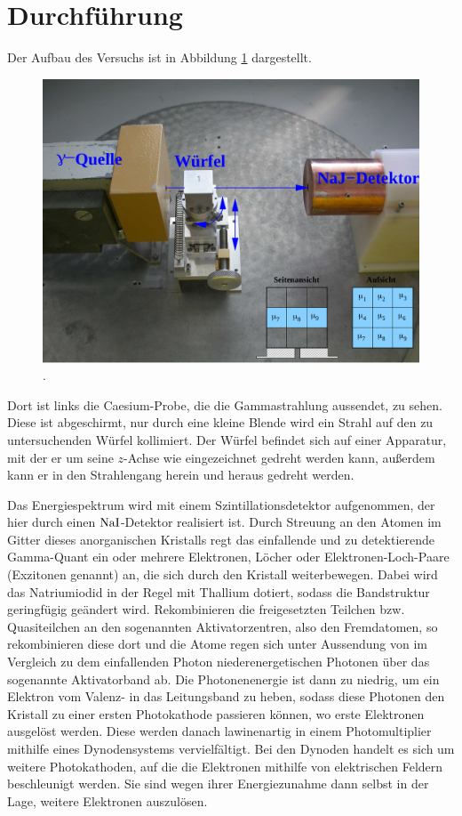 \section{Durchführung}
\label{sec:Durchführung}

Der Aufbau des Versuchs ist in Abbildung \ref{fig:aufbau} dargestellt.

\begin{figure}
  \centering
  \includegraphics[width=\textwidth]{images/aufbau.png}
  \caption{\cite{Beschriftung} \cite{Versuchsanleitung}.}
  \label{fig:aufbau}
\end{figure}

Dort ist links die Caesium-Probe, die die Gammastrahlung aussendet, zu sehen. Diese ist abgeschirmt, nur durch eine kleine Blende wird ein Strahl auf den zu untersuchenden Würfel kollimiert. Der Würfel befindet sich auf einer Apparatur, mit der er um seine $z$-Achse wie eingezeichnet gedreht werden kann, außerdem kann er in den Strahlengang herein und heraus gedreht werden.

Das Energiespektrum wird mit einem Szintillationsdetektor aufgenommen, der hier durch einen $\ce{NaI}$-Detektor realisiert ist. Durch Streuung an den Atomen im Gitter dieses anorganischen Kristalls regt das einfallende und zu detektierende Gamma-Quant ein oder mehrere Elektronen, Löcher oder Elektronen-Loch-Paare (Exzitonen genannt) an, die sich durch den Kristall weiterbewegen. Dabei wird das Natriumiodid in der Regel mit Thallium dotiert, sodass die Bandstruktur geringfügig geändert wird. Rekombinieren die freigesetzten Teilchen bzw. Quasiteilchen an den sogenannten Aktivatorzentren, also den Fremdatomen, so rekombinieren diese dort und die Atome regen sich unter Aussendung von im Vergleich zu dem einfallenden Photon niederenergetischen Photonen über das sogenannte Aktivatorband ab. Die Photonenenergie ist dann zu niedrig, um ein Elektron vom Valenz- in das Leitungsband zu heben, sodass diese Photonen den Kristall zu einer ersten Photokathode passieren können, wo erste Elektronen ausgelöst werden.
Diese werden danach lawinenartig in einem Photomultiplier mithilfe eines Dynodensystems vervielfältigt. Bei den Dynoden handelt es sich um weitere Photokathoden, auf die die Elektronen mithilfe von elektrischen Feldern beschleunigt werden. Sie sind wegen ihrer Energiezunahme dann selbst in der Lage, weitere Elektronen auszulösen.


